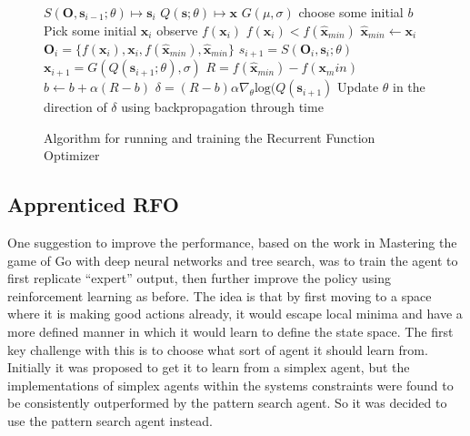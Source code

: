 \begin{figure}
\centering
\begin{minipage}{.8\textwidth}
\begin{algorithmic}
\State $S(\boldsymbol{O}, \boldsymbol{s}_{i-1}; \theta) \mapsto \boldsymbol{s}_i$
\State $Q(\boldsymbol{s} ;\theta) \mapsto \boldsymbol{x} $
\State $G(\mu,\sigma)$  
\State choose some initial $b$ 
 \Repeat
 	\State Pick some initial $\boldsymbol{x}_i$
 	\Repeat
 		\State observe $f(\boldsymbol{x}_i)$
 		\If $f(\boldsymbol{x}_i) < f(\hat{\boldsymbol{x}}_{min})$
 			\State$ \hat{\boldsymbol{x}}_{min} \gets \boldsymbol{x}_i$
 		\EndIf
 		\State $\boldsymbol{O}_i = \{f(\boldsymbol{x}_i),\boldsymbol{x}_i, f(\hat{\boldsymbol{x}}_{min}), \hat{\boldsymbol{x}}_{min}\} $
 		\State $s_{i+1} = S(\boldsymbol{O}_i, \boldsymbol{s}_{i}; \theta)$
 		\State $\boldsymbol{x}_{i+1} = G(Q(\boldsymbol{s}_{i+1};\theta),\sigma)$ 
	\State $R = f(\hat{\boldsymbol{x}}_{min}) - f(\boldsymbol{x}_min)$
	\State $b \gets b  + \alpha (R - b)$ 
	\State $\delta = (R - b) \alpha \nabla_\theta \text{log}(Q(\boldsymbol{s}_{i+1})$
	\State Update $\theta$ in the direction of $\delta$ using backpropagation through time
 \end{algorithmic}
 \end{minipage}
 \caption{Algorithm for running and training the Recurrent Function Optimizer}
 \label{alg:rfo}
\end{figure}

\subsection{Apprenticed RFO}



One suggestion to improve the performance, based on the work in Mastering the game of Go with deep neural networks and tree search\cite{alphaGo}, was to train the agent to first replicate ``expert'' output, then further improve the policy using reinforcement learning as before. The idea is that by first moving to a space where it is making good actions already, it would escape local minima and have a more defined manner in which it would learn to define the state space. The first key challenge with this is to choose what sort of agent it should learn from. Initially it was proposed to get it to learn from a simplex agent, but the implementations of simplex agents within the systems constraints were found to be consistently outperformed by the pattern search agent. So it was decided to use the pattern search agent instead.

